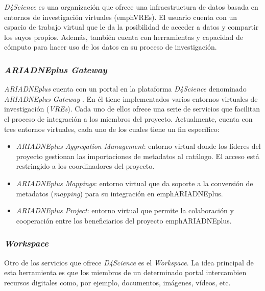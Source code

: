 \emph{D4Science} \cite{weboff:dfour}
es una organización que ofrece una infraestructura de datos basada en
entornos de investigación virtuales (emph{VREs}). El usuario cuenta con un espacio de trabajo virtual
que le da la posibilidad de acceder a datos y compartir los suyos
propios. Además, también cuenta con herramientas y capacidad de cómputo
para hacer uso de los datos en su proceso de investigación.


\subsubsection{\emph{ARIADNEplus Gateway}}

\emph{ARIADNEplus} cuenta con un portal en la plataforma
\emph{D4Science} denominado \emph{ARIADNEplus Gateway} \cite{weboff:aplusgat}. En él tiene
implementados varios entornos virtuales de investigación (\emph{VREs}).
Cada uno de ellos ofrece una serie de servicios que facilitan el proceso
de integración a los miembros del proyecto. Actualmente, cuenta con tres
entornos virtuales, cada uno de los cuales tiene un fin específico:


\begin{itemize}
\tightlist
\item
  \emph{ARIADNEplus Aggregation Management}: entorno virtual donde
  los líderes del proyecto gestionan las importaciones de metadatos al
  catálogo. El acceso está restringido a los coordinadores del proyecto.
\item
  \emph{ARIADNEplus Mappings}: entorno virtual que da soporte a la
  conversión de metadatos (\emph{mapping}) para su integración en
  emph{ARIADNEplus}.
\item
  \emph{ARIADNEplus Project}: entorno virtual que permite la
  colaboración y cooperación entre los beneficiarios del proyecto
  emph{ARIADNEplus}.
\end{itemize}

\subsubsection{\emph{Workspace}}

Otro de los servicios que ofrece \emph{D4Science} es el
\emph{Workspace}. La idea principal de esta herramienta es que los
miembros de un determinado portal intercambien recursos digitales como,
por ejemplo, documentos, imágenes, vídeos, etc.

